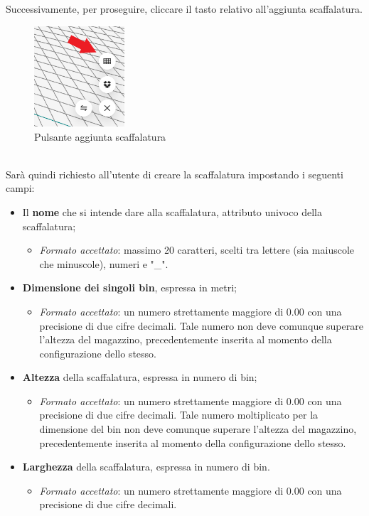             \noindent Successivamente, per proseguire, cliccare il tasto relativo all'aggiunta scaffalatura.\\
            \begin{figure}[h!]
                \centering
                \includegraphics[width=0.3\textwidth]{images/aggiunta_scaffalatura.png}
                \caption{Pulsante aggiunta scaffalatura}
            \end{figure}
            \\
            \noindent Sarà quindi richiesto all'utente di creare la scaffalatura impostando i seguenti campi:
            \begin{itemize}
                \item Il \textbf{nome} che si intende dare alla scaffalatura, attributo univoco della scaffalatura;
                    \begin{itemize}
                        \item \textit{Formato accettato}: massimo 20 caratteri, scelti tra lettere (sia maiuscole che minuscole), numeri e "\_".
                    \end{itemize}
                \item \textbf{Dimensione dei singoli bin}, espressa in metri;
                    \begin{itemize}
                        \item \textit{Formato accettato}: un numero strettamente maggiore di 0.00 con una precisione di due cifre decimali. Tale numero non deve comunque superare l'altezza del magazzino, precedentemente inserita al momento della configurazione dello stesso.
                    \end{itemize}
                \item \textbf{Altezza} della scaffalatura, espressa in numero di bin;
                    \begin{itemize}
                        \item \textit{Formato accettato}: un numero strettamente maggiore di 0.00 con una precisione di due cifre decimali. Tale numero moltiplicato per la dimensione del bin non deve comunque superare l'altezza del magazzino, precedentemente inserita al momento della configurazione dello stesso.
                    \end{itemize}
                \item \textbf{Larghezza} della scaffalatura, espressa in numero di bin.
                    \begin{itemize}
                        \item \textit{Formato accettato}: un numero strettamente maggiore di 0.00 con una precisione di due cifre decimali.
                    \end{itemize}
            \end{itemize}

